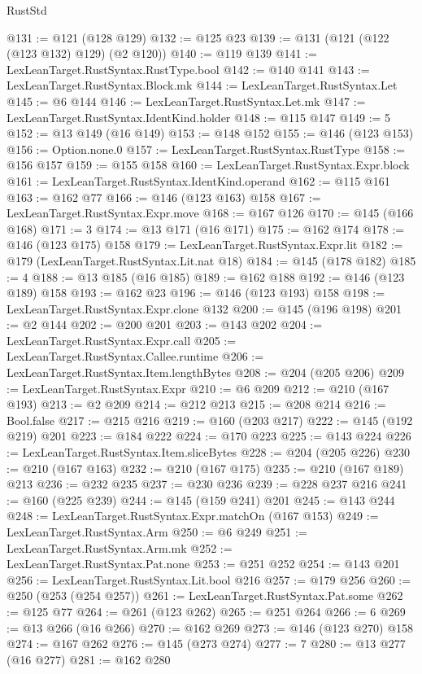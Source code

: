\begin{lexlean}{RustStd}
\begin{coremodule}
{\begin{coremodule}
{{{{{@131 := @121 (@128 @129)
@132 := @125 @23
@139 := @131 (@121 (@122 (@123 @132) @129) (@2 @120))
@140 := @119 @139
@141 := LexLeanTarget.RustSyntax.RustType.bool
@142 := @140 @141
@143 := LexLeanTarget.RustSyntax.Block.mk
@144 := LexLeanTarget.RustSyntax.Let
@145 := @6 @144
@146 := LexLeanTarget.RustSyntax.Let.mk
@147 := LexLeanTarget.RustSyntax.IdentKind.holder
@148 := @115 @147
@149 := 5
@152 := @13 @149 (@16 @149)
@153 := @148 @152
@155 := @146 (@123 @153)
@156 := Option.none.{0}
@157 := LexLeanTarget.RustSyntax.RustType
@158 := @156 @157
@159 := @155 @158
@160 := LexLeanTarget.RustSyntax.Expr.block
@161 := LexLeanTarget.RustSyntax.IdentKind.operand
@162 := @115 @161
@163 := @162 @77
@166 := @146 (@123 @163) @158
@167 := LexLeanTarget.RustSyntax.Expr.move
@168 := @167 @126
@170 := @145 (@166 @168)
@171 := 3
@174 := @13 @171 (@16 @171)
@175 := @162 @174
@178 := @146 (@123 @175) @158
@179 := LexLeanTarget.RustSyntax.Expr.lit
@182 := @179 (LexLeanTarget.RustSyntax.Lit.nat @18)
@184 := @145 (@178 @182)
@185 := 4
@188 := @13 @185 (@16 @185)
@189 := @162 @188
@192 := @146 (@123 @189) @158
@193 := @162 @23
@196 := @146 (@123 @193) @158
@198 := LexLeanTarget.RustSyntax.Expr.clone @132
@200 := @145 (@196 @198)
@201 := @2 @144
@202 := @200 @201
@203 := @143 @202
@204 := LexLeanTarget.RustSyntax.Expr.call
@205 := LexLeanTarget.RustSyntax.Callee.runtime
@206 := LexLeanTarget.RustSyntax.Item.lengthBytes
@208 := @204 (@205 @206)
@209 := LexLeanTarget.RustSyntax.Expr
@210 := @6 @209
@212 := @210 (@167 @193)
@213 := @2 @209
@214 := @212 @213
@215 := @208 @214
@216 := Bool.false
@217 := @215 @216
@219 := @160 (@203 @217)
@222 := @145 (@192 @219) @201
@223 := @184 @222
@224 := @170 @223
@225 := @143 @224
@226 := LexLeanTarget.RustSyntax.Item.sliceBytes
@228 := @204 (@205 @226)
@230 := @210 (@167 @163)
@232 := @210 (@167 @175)
@235 := @210 (@167 @189) @213
@236 := @232 @235
@237 := @230 @236
@239 := @228 @237 @216
@241 := @160 (@225 @239)
@244 := @145 (@159 @241) @201
@245 := @143 @244
@248 := LexLeanTarget.RustSyntax.Expr.matchOn (@167 @153)
@249 := LexLeanTarget.RustSyntax.Arm
@250 := @6 @249
@251 := LexLeanTarget.RustSyntax.Arm.mk
@252 := LexLeanTarget.RustSyntax.Pat.none
@253 := @251 @252
@254 := @143 @201
@256 := LexLeanTarget.RustSyntax.Lit.bool @216
@257 := @179 @256
@260 := @250 (@253 (@254 @257))
@261 := LexLeanTarget.RustSyntax.Pat.some
@262 := @125 @77
@264 := @261 (@123 @262)
@265 := @251 @264
@266 := 6
@269 := @13 @266 (@16 @266)
@270 := @162 @269
@273 := @146 (@123 @270) @158
@274 := @167 @262
@276 := @145 (@273 @274)
@277 := 7
@280 := @13 @277 (@16 @277)
@281 := @162 @280
}}}}}
\end{coremodule}}
\end{coremodule}
\end{lexlean}
